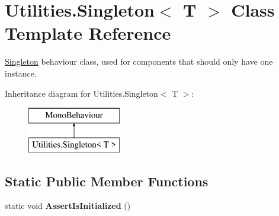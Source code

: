 \hypertarget{class_utilities_1_1_singleton}{}\section{Utilities.\+Singleton$<$ T $>$ Class Template Reference}
\label{class_utilities_1_1_singleton}


\mbox{\hyperlink{class_utilities_1_1_singleton}{Singleton}} behaviour class, used for components that should only have one instance.  


Inheritance diagram for Utilities.\+Singleton$<$ T $>$\+:\begin{figure}[H]
\begin{center}
\leavevmode
\includegraphics[height=2.000000cm]{class_utilities_1_1_singleton}
\end{center}
\end{figure}
\subsection*{Static Public Member Functions}
\begin{DoxyCompactItemize}
\item 
\mbox{\label{class_utilities_1_1_singleton_a123c0df7e7714b113a68d48f1d247a04}} 
static void {\bfseries Assert\+Is\+Initialized} ()
\end{DoxyCompactItemize}

